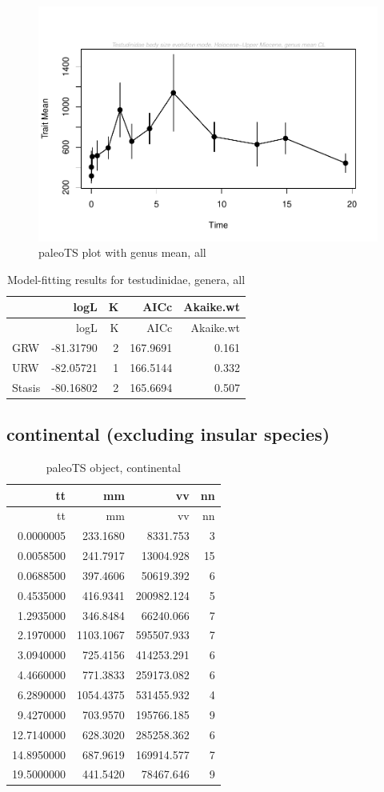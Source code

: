\begin{figure}[H]
	\centering
	\includegraphics{MA_JJ_files/figure-latex/paleoTSAll-1.pdf}
	\caption{paleoTS plot with genus mean, all}
	\label{fig:pTSall}
\end{figure}

\begin{longtable}[]{@{}lrrrr@{}}
	\caption{Model-fitting results for testudinidae, genera,
		all}
	\label{tab:pTSallEM}\tabularnewline
	\toprule
	& logL & K & AICc & Akaike.wt\tabularnewline
	\midrule
	\endfirsthead
	\toprule
	& logL & K & AICc & Akaike.wt\tabularnewline
	\midrule
	\endhead
	GRW & -81.31790 & 2 & 167.9691 & 0.161\tabularnewline
	URW & -82.05721 & 1 & 166.5144 & 0.332\tabularnewline
	Stasis & -80.16802 & 2 & 165.6694 & 0.507\tabularnewline
	\bottomrule
\end{longtable}

\FloatBarrier

\subsection{continental (excluding insular
	species)}\label{continental-excluding-insular-species}


\begin{longtable}[H]{@{}rrrr@{}}
	\caption{paleoTS object, continental}
	\label{tab:pTSC}\tabularnewline
	\toprule
	tt & mm & vv & nn\tabularnewline
	\midrule
	\endfirsthead
	\toprule
	tt & mm & vv & nn\tabularnewline
	\midrule
	\endhead
	0.0000005 & 233.1680 & 8331.753 & 3\tabularnewline
	0.0058500 & 241.7917 & 13004.928 & 15\tabularnewline
	0.0688500 & 397.4606 & 50619.392 & 6\tabularnewline
	0.4535000 & 416.9341 & 200982.124 & 5\tabularnewline
	1.2935000 & 346.8484 & 66240.066 & 7\tabularnewline
	2.1970000 & 1103.1067 & 595507.933 & 7\tabularnewline
	3.0940000 & 725.4156 & 414253.291 & 6\tabularnewline
	4.4660000 & 771.3833 & 259173.082 & 6\tabularnewline
	6.2890000 & 1054.4375 & 531455.932 & 4\tabularnewline
	9.4270000 & 703.9570 & 195766.185 & 9\tabularnewline
	12.7140000 & 628.3020 & 285258.362 & 6\tabularnewline
	14.8950000 & 687.9619 & 169914.577 & 7\tabularnewline
	19.5000000 & 441.5420 & 78467.646 & 9\tabularnewline
	\bottomrule
\end{longtable}

